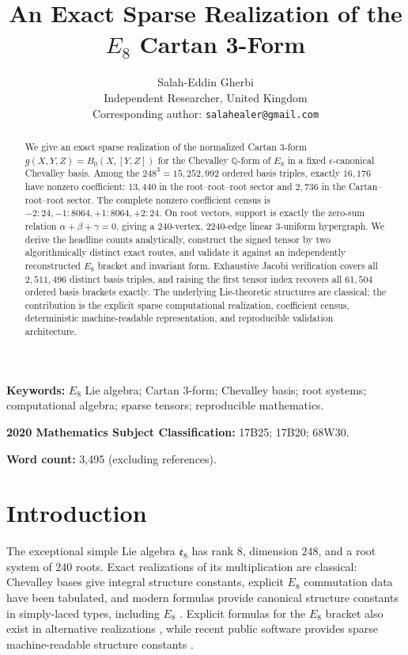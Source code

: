 \documentclass[11pt]{article}
\title{\textbf{An Exact Sparse Realization of the $E_8$ Cartan 3-Form}}
\author{Salah-Eddin Gherbi\\
Independent Researcher, United Kingdom\\
Corresponding author: \texttt{salahealer@gmail.com}}
\date{}
\theoremstyle{definition}
\theoremstyle{remark}
\newcommand{\e}{\mathfrak e}
\begin{document}
\maketitle

\begin{abstract}
We give an exact sparse realization of the normalized Cartan 3-form \(g(X,Y,Z)=B_0(X,[Y,Z])\) for the Chevalley \(\mathbb Q\)-form of \(E_8\) in a fixed \(\epsilon\)-canonical Chevalley basis. Among the \(248^3=15{,}252{,}992\) ordered basis triples, exactly \(16{,}176\) have nonzero coefficient: \(13{,}440\) in the root--root--root sector and \(2{,}736\) in the Cartan--root--root sector. The complete nonzero coefficient census is \(-2:24,-1:8064,+1:8064,+2:24\). On root vectors, support is exactly the zero-sum relation \(\alpha+\beta+\gamma=0\), giving a 240-vertex, 2240-edge linear 3-uniform hypergraph. We derive the headline counts analytically, construct the signed tensor by two algorithmically distinct exact routes, and validate it against an independently reconstructed \(E_8\) bracket and invariant form. Exhaustive Jacobi verification covers all \(2{,}511{,}496\) distinct basis triples, and raising the first tensor index recovers all \(61{,}504\) ordered basis brackets exactly. The underlying Lie-theoretic structures are classical; the contribution is the explicit sparse computational realization, coefficient census, deterministic machine-readable representation, and reproducible validation architecture.
\end{abstract}

\noindent\textbf{Keywords:}
$E_8$ Lie algebra; Cartan 3-form; Chevalley basis; root systems;
computational algebra; sparse tensors; reproducible mathematics.

\noindent\textbf{2020 Mathematics Subject Classification:}
17B25; 17B20; 68W30.

\noindent\textbf{Word count:} 3,495 (excluding references).


\section{Introduction}

The exceptional simple Lie algebra $\e_8$ has rank $8$, dimension $248$, and a root system of $240$ roots.  Exact realizations of its multiplication are classical: Chevalley bases give integral structure constants, explicit $E_8$ commutation data have been tabulated, and modern formulas provide canonical structure constants in simply-laced types, including $E_8$ \cite{Djokovic2000,GeckLang2025}.  Explicit formulas for the $E_8$ bracket also exist in alternative realizations \cite{Kollross2025}, while recent public software provides sparse machine-readable structure constants \cite{McGirl2026}.
\end{document}
